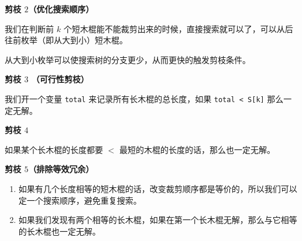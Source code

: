 \textbf{剪枝 $2$（优化搜索顺序）}

我们在判断前 $k$ 个短木棍能不能裁剪出来的时候，直接搜索就可以了，可以从后往前枚举（即从大到小）短木棍。

从大到小枚举可以使搜索树的分支更少，从而更快的触发剪枝条件。

\textbf{剪枝 $3$ （可行性剪枝）}

我们开一个变量 \verb|total| 来记录所有长木棍的总长度，如果 \verb|total < S[k]| 那么一定无解。

\textbf{剪枝 $4$ }

如果某个长木棍的长度都要 $<$ 最短的木棍的长度的话，那么也一定无解。

\textbf{剪枝 $5$（排除等效冗余）}
\begin{enumerate}
\item 如果有几个长度相等的短木棍的话，改变裁剪顺序都是等价的，所以我们可以定一个搜索顺序，避免重复搜索。

\item 如果我们发现有两个相等的长木棍，如果在第一个长木棍无解，那么与它相等的长木棍也一定无解。

\end{enumerate}

